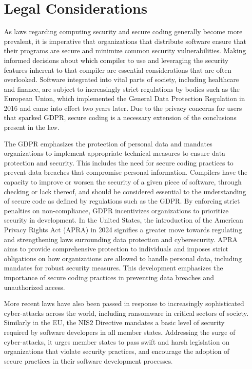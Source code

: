 \documentclass[sigconf, anonymous]{acmart}
\begin{document}
\section{Legal Considerations}
\label{legal considerations}

As laws regarding computing security and secure coding generally become more prevalent, it is imperative that organizations that distribute software ensure that their programs are secure and minimize common security vulnerabilities. Making informed decisions about which compiler to use and leveraging the security features inherent to that compiler are essential considerations that are often overlooked. Software integrated into vital parts of society, including healthcare and finance, are subject to increasingly strict regulations by bodies such as the European Union, which implemented the General Data Protection Regulation in 2016\cite{gdpr2016} and came into effect two years later. Due to the privacy concerns for users that sparked GDPR, secure coding is a necessary extension of the conclusions present in the law.

The GDPR emphasizes the protection of personal data and mandates organizations to implement appropriate technical measures to ensure data protection and security. This includes the need for secure coding practices to prevent data breaches that compromise personal information. Compilers have the capacity to improve or worsen the security of a given piece of software, through checking or lack thereof, and should be considered essential to the understanding of secure code as defined by regulations such as the GDPR. By enforcing strict penalties on non-compliance, GDPR incentivizes organizations to prioritize security in development. In the United States, the introduction of the American Privacy Rights Act (APRA)\cite{apra2024} in 2024 signifies a greater move towards regulating and strengthening laws surrounding data protection and cybersecurity. APRA aims to provide comprehensive protection to individuals and imposes strict obligations on how organizations are allowed to handle personal data, including mandates for robust security measures. This development emphasizes the importance of secure coding practices in preventing data breaches and unauthorized access.

More recent laws have also been passed in response to increasingly sophisticated cyber-attacks across the world, including ransomware in critical sectors of society. Similarly in the EU, the NIS2 Directive\cite{nis2024} mandates a basic level of security required by software developers in all member states. Addressing the surge of cyber-attacks, it urges member states to pass swift and harsh legislation on organizations that violate security practices, and encourage the adoption of secure practices in their software development processes.
\end{document}
